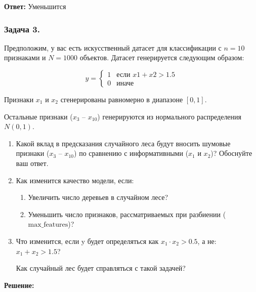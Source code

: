 \textbf{Ответ:} Уменьшится

\subsubsection*{Задача 3.}

Предположим, у вас есть искусственный датасет для классификации с $n = 10$ признаками и $N = 1000$ объектов. Датасет генерируется следующим образом:

$$
    y = \begin{cases}
        1 & \text{если } x1 + x2 > 1.5 \\
        0 & \text{иначе}
    \end{cases}
$$

Признаки $x_1$ и $x_2$ сгенерированы равномерно в диапазоне $[0, 1]$.

Остальные признаки ($x_3$ – $x_{10}$) генерируются из нормального распределения $N(0, 1)$.

\begin{enumerate}
    \item  Какой вклад в предсказания случайного леса будут вносить шумовые признаки
          ($x_3$ – $x_{10}$) по сравнению с информативными ($x_1$ и $x_2$)? Обоснуйте ваш ответ.

    \item Как изменится качество модели, если:
          \begin{enumerate}
              \item Увеличить число деревьев в случайном лесе?
              \item Уменьшить число признаков, рассматриваемых при разбиении (\(\text{max\_features}\))?
          \end{enumerate}

    \item Что изменится, если y будет определяться как
          $x_1 \cdot x_2 > 0.5$,
          а не:
          $x_1 + x_2 > 1.5$?

          Как случайный лес будет справляться с такой задачей?

\end{enumerate}

\textbf{Решение:}

